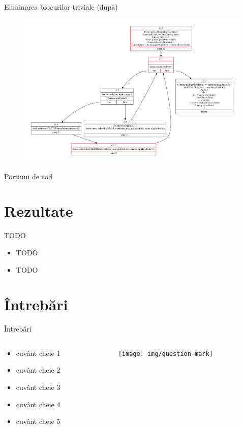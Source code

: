 \documentclass{beamer}
\begin{document}
\begin{frame}{Eliminarea blocurilor triviale (după)}
    \begin{figure}[htb]
        \centering
        \includegraphics[width=\linewidth]{../../../theses/diploma/src/graph/trivial-after.pdf}
    \end{figure}
\end{frame}

\begin{frame}{Porțiuni de cod}
	
\end{frame}
	
\section{Rezultate}

\begin{frame}{TODO}
	\begin{itemize}
		\item TODO
		\item TODO
	\end{itemize}
\end{frame}

\section{\^{I}ntrebări}

\begin{frame}{Întrebări}
  \begin{columns}
    \begin{column}[t]{0.5\textwidth}
      \begin{itemize}
        \item cuvânt cheie 1
        \item cuvânt cheie 2
        \item cuvânt cheie 3
        \item cuvânt cheie 4
        \item cuvânt cheie 5
      \end{itemize}
    \end{column}
    \begin{column}[c]{0.5\textwidth}
      \begin{figure}
        \texttt{[image: img/question-mark]}
      \end{figure}
    \end{column}
  \end{columns}
\end{frame}
\end{document}
